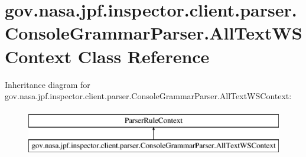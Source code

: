 \hypertarget{classgov_1_1nasa_1_1jpf_1_1inspector_1_1client_1_1parser_1_1_console_grammar_parser_1_1_all_text_w_s_context}{}\section{gov.\+nasa.\+jpf.\+inspector.\+client.\+parser.\+Console\+Grammar\+Parser.\+All\+Text\+W\+S\+Context Class Reference}
\label{classgov_1_1nasa_1_1jpf_1_1inspector_1_1client_1_1parser_1_1_console_grammar_parser_1_1_all_text_w_s_context}
Inheritance diagram for gov.\+nasa.\+jpf.\+inspector.\+client.\+parser.\+Console\+Grammar\+Parser.\+All\+Text\+W\+S\+Context\+:\begin{figure}[H]
\begin{center}
\leavevmode
\includegraphics[height=2.000000cm]{classgov_1_1nasa_1_1jpf_1_1inspector_1_1client_1_1parser_1_1_console_grammar_parser_1_1_all_text_w_s_context}
\end{center}
\end{figure}
